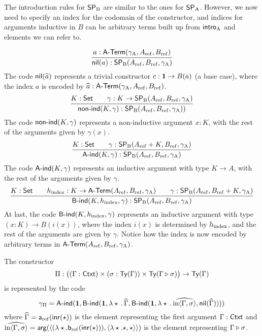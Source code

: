 \documentclass{article}
\begin{document}
The introduction rules for $\mathsf{SP}_{\mathrm{B}}$ are similar to the ones for $\mathsf{SP}_{\mathrm{A}}$.
However, we now need to specify an index for the codomain of the
constructor, and indices for arguments inductive in $B$ can be
arbitrary terms built up from $\mathsf{intro}_{\mathrm{A}}$ and elements we can refer to.

\[
\infer{\nilB(a) : \SPB(\Aref, \Bref, \gammaA)}{a : \Aterm(\gammaA, \Aref, \Bref)}
\]
%
The code $\mathsf{nil}(\widehat{a})$ represents a trivial constructor $c :
\mathbf{1} \to B(a)$ (a base case), where the index $a$ is encoded by
$\widehat{a} : \mathsf{A}\text{-}\mathsf{Term}(\gamma_{\mathrm{A}}, A_{\mathrm{ref}}, B_{\mathrm{ref}})$.
%
\[
\infer{\nonindB(K, \gamma) : \SPB(\Aref, \Bref, \gammaA))}{K : \Set & \quad \gamma : K \to \SPB(\Aref, \Bref, \gammaA)}
\]
%
The code $\mathsf{non}\text{-}\mathsf{ind}(K, \gamma)$ represents a non-inductive argument $x: K$, with the rest of the arguments given by $\gamma(x)$.
%
\[
\infer{\AindB(K, \gamma) : \SPB(\Aref, \Bref, \gammaA)}{K : \Set & \quad \gamma : \SPB(\Aref + K, \Bref, \gammaA)}
\]
%
The code $\mathsf{A}\text{-}\mathsf{ind}(K, \gamma)$ represents an inductive argument with
type $K \to A$, with the rest of the arguments given by
$\gamma$. %
%
\[
\infer{\BindB(K, \hindex, \gamma) : \SPB(\Aref, \Bref, \gammaA)}{K : \Set & \quad \hindex : K \to \Aterm(\Aref, \Bref, \gammaA) & \quad \gamma : \SPB(\Aref, \Bref + K, \gammaA)}
\]
%
At last, the code $\mathsf{B}\text{-}\mathsf{ind}(K, h_{\mathrm{index}}, \gamma)$ represents an inductive
argument with type $(x : K) \to B(i(x))$, where the index $i(x)$ is
determined by $h_{\mathrm{index}}$, and the rest of the arguments are given by
$\gamma$. Notice how the index is now encoded by arbitrary terms in
$\mathsf{A}\text{-}\mathsf{Term}(A_{\mathrm{ref}}, B_{\mathrm{ref}}, \gamma_{\mathrm{A}})$.
%
\begin{example}
  The constructor
  \[
  \Pi : \big((\Gamma : \mathsf{Ctxt}) \times (\sigma : \mathsf{Ty}(\Gamma)) \times \mathsf{Ty}(\Gamma \triangleright \sigma)\big)\to \mathsf{Ty}(\Gamma)
  \]
  is represented by the code
  \[
  \gamma_{\Pi} = \mathsf{A}\text{-}\mathsf{ind}(\mathbf{1},
                  \mathsf{B}\text{-}\mathsf{ind}(\mathbf{1}, \lambda \star\,.\,\widehat{\Gamma}, 
                    \mathsf{B}\text{-}\mathsf{ind}(\mathbf{1}, \lambda \star\,.\,\widehat{\text{in}\langle \Gamma , \sigma\rangle},
                      \mathsf{nil}(\widehat{\Gamma}))))
  \]
  where $\widehat{\Gamma} = \mathsf{a}_{\mathrm{ref}}(\mathsf{inr}(\star))$ is the element
  representing the first argument $\Gamma : \mathsf{Ctxt}$ and
  $\widehat{\text{in}\langle \Gamma , \sigma\rangle} = \mathsf{arg}(\langle
  (\lambda \star.\mathsf{b}_{\mathrm{ref}}(\mathsf{inr}(\star))), \langle \lambda
  \star.\star, \star\rangle\rangle)$ is the element representing
  $\Gamma \triangleright \sigma$.  \blackqed
\end{example}
\end{document}
